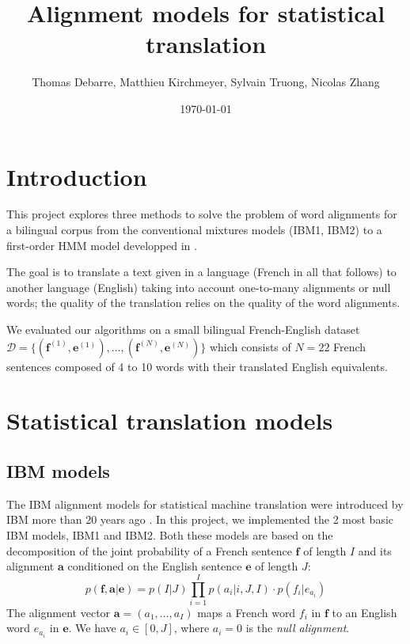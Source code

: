 \documentclass[final]{beamer}
\title
[Probabilistic Graphical Models Poster Session, Wed 4 Jan 2017] %
{ %
Alignment models for statistical translation
}
\author{ %
Thomas Debarre, Matthieu Kirchmeyer, Sylvain Truong, Nicolas Zhang
}
\institute
{\mbox{}
}
\date{\today}
\begin{document}
\begin{frame}[t]
\begin{multicols}{3}

\section{Introduction}

This project explores three methods to solve the problem of word alignments for a bilingual corpus from the conventional mixtures models (IBM1, IBM2) to a first-order HMM model developped in \cite{vogel}. 

The goal is to translate a text given in a language (French in all that follows) to another language (English) taking into account one-to-many alignments or null words; the quality of the translation relies on the quality of the word alignments.

We evaluated our algorithms on a small bilingual French-English dataset $\mathcal{D} = \{ (\textbf{f}^{(1)},\textbf{e}^{(1)}), \dots , (\textbf{f}^{(N)},\textbf{e}^{(N)})\}$ which consists of $N = 22$ French sentences composed of 4 to 10 words with their translated English equivalents. 

\section{Statistical translation models}

\subsection{IBM models}
The IBM alignment models for statistical machine translation were introduced by IBM more than 20 years ago \cite{brown}. In this project, we implemented the 2 most basic IBM models, IBM1 and IBM2. Both these models are based on the decomposition of the joint probability of a French sentence $\textbf{f}$ of length $I$ and its alignment $\textbf{a}$ conditioned on the English sentence $\textbf{e}$ of length $J$:
\begin{equation*}
p(\textbf{f}, \textbf{a} \vert \textbf{e}) = p(I \vert J) \prod_{i=1}^I p(a_i \vert i, J, I) \cdot p(f_i \vert e_{a_i})
\end{equation*}
The alignment vector $\textbf{a} = (a_1, \hdots, a_I)$ maps a French word $f_i$ in $\textbf{f}$ to an English word $e_{a_i}$ in $\textbf{e}$. We have $a_i \in [0, J]$, where $a_i = 0$ is the \textit{null alignment}.


\end{multicols}
\end{frame}
\end{document}
